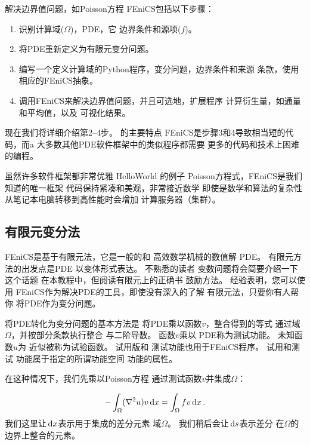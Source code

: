 解决边界值问题，如Poisson方程
FEniCS包括以下步骤：

\begin{enumerate}
\item 识别计算域($\Omega$)，PDE，它 边界条件和源项($f$)。
\item 将PDE重新定义为有限元变分问题。
\item 编写一个定义计算域的Python程序，变分问题，边界条件和来源
  条款，使用相应的FEniCS抽象。
\item 调用FEniCS来解决边界值问题，并且可选地，扩展程序
计算衍生量，如通量和平均值，以及 可视化结果。
\end{enumerate}

\noindent
现在我们将详细介绍第2--4步。 的主要特点
FEniCS是步骤3和4导致相当短的代码，而a
大多数其他PDE软件框架中的类似程序都需要
更多的代码和技术上困难的编程。

\begin{notice}[什么使FEniCS有吸引力？]
虽然许多软件框架都非常优雅
HelloWorld 的例子
Poisson方程式，FEniCS是我们知道的唯一框架
代码保持紧凑和美观，非常接近数学
即使是数学和算法的复杂性
从笔记本电脑转移到高性能时会增加
计算服务器（集群）。
\end{notice}

\subsection{有限元变分法}
\label{ch:poisson0:varform}

FEniCS是基于有限元法，它是一般的和
高效数学机械的数值解
PDE。 有限元方法的出发点是PDE
以变体形式表达。 不熟悉的读者
变数问题将会简要介绍一下这个话题
在本教程中，但阅读有限元上的正确书
鼓励方法。 经验表明，您可以使用
FEniCS作为解决PDE的工具，即使没有深入的了解
有限元法，只要你有人帮你
将PDE作为变分问题。


将PDE转化为变分问题的基本方法是
将PDE乘以函数$v$，整合得到的等式
通过域$\Omega$，并按部分条款执行整合
与二阶导数。 函数$v$乘以
PDE称为测试功能。 未知函数$u$为
近似被称为试验函数。 试用版和
测试功能也用于FEniCS程序。 试用和测试
功能属于指定的所谓功能空间
功能的属性。


在这种情况下，我们先乘以Poisson方程
通过测试函数$v$并集成$\Omega$：

\begin{equation}
\label{ch:poisson0:multbyv}
-\int_\Omega (\nabla^2 u)v \dx = \int_\Omega fv \dx\tp
\end{equation}
我们这里让$\dx$表示用于集成的差分元素
域$\Omega$。 我们稍后会让$\ds$表示差分
在$\Omega$的边界上整合的元素。


